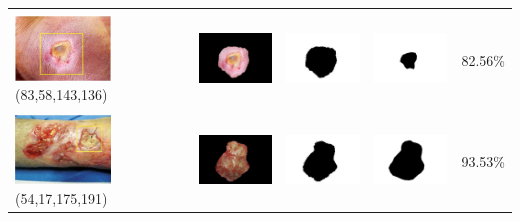\begin{table}[H]
\begin{tabular}{|m{1.0in}|m{1.0in}|m{1.0in}|m{1.0in}|m{0.6in}|}
		&  &  & \\
		\includegraphics[width=1.0in]{gambar/hasil_segmentasi/luka_kuning/image_21_rect.jpg} {\centering\fontsize{10}{10}\selectfont(83,58,143,136)}&
		\includegraphics[width=1.0in]{gambar/hasil_segmentasi/luka_kuning/result_21.jpg}&
		\includegraphics[width=1.0in]{gambar/hasil_segmentasi/luka_kuning/mask_r_21.jpg}&
		\includegraphics[width=1.0in]{gambar/hasil_segmentasi/luka_kuning/21_r.jpg}&
		82.56\% \\
		\hline

		
		&  &  & \\
		\includegraphics[width=1.0in]{gambar/hasil_segmentasi/luka_kuning/image_13_rect.jpg} {\centering\fontsize{10}{10}\selectfont(54,17,175,191)}&
		\includegraphics[width=1.0in]{gambar/hasil_segmentasi/luka_kuning/result_23.jpg}&
		\includegraphics[width=1.0in]{gambar/hasil_segmentasi/luka_kuning/mask_r_23.jpg}&
		\includegraphics[width=1.0in]{gambar/hasil_segmentasi/luka_kuning/23_r.jpg}&
		93.53\% \\
		\hline

	\end{tabular}
\end{table}



